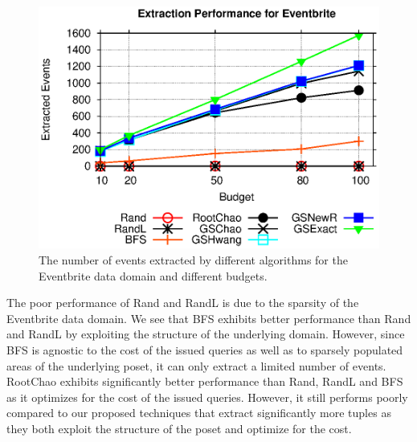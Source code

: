 \begin{figure}[h]
	\begin{center}
	\includegraphics[clip,scale=0.5]{figs/ebExtractionAll.eps}
	\caption{The number of events extracted by different algorithms for the Eventbrite data domain and different budgets.}
	\label{fig:ebextraction}
	\end{center}
	\vspace{-15pt}
\end{figure}

The poor performance of Rand and RandL is due to the sparsity of the Eventbrite data domain. We see that BFS exhibits better performance than Rand and RandL by exploiting the structure of the underlying domain. However, since BFS is agnostic to the cost of the issued queries as well as to sparsely populated areas of the underlying poset, it can only extract a limited number of events. RootChao exhibits significantly better performance than Rand, RandL and BFS as it optimizes for the cost of the issued queries. However, it still performs poorly compared to our proposed techniques that extract significantly more tuples as they both exploit the structure of the poset and optimize for the cost.

